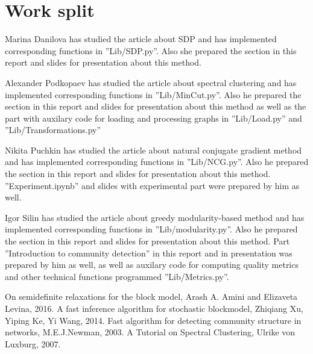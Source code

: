 \documentclass[11pt,a4paper]{extarticle}
\begin{document}
\section{Work split}

Marina Danilova has studied the article about SDP and has implemented corresponding functions in ''Lib/SDP.py''. 
Also she prepared the section in this report and slides for presentation about this method.

Alexander Podkopaev has studied the article about spectral clustering and has implemented corresponding functions in ''Lib/MinCut.py''.
Also he prepared the section in this report and slides for presentation about this method as well as the part with auxilary code for loading and processing graphs in ''Lib/Load.py'' and ''Lib/Transformations.py''

Nikita Puchkin has studied the article about natural conjugate gradient method and has implemented corresponding functions in ''Lib/NCG.py''.
Also he prepared the section in this report and slides for presentation about this method. ''Experiment.ipynb'' and slides with experimental part were prepared by him as well.

Igor Silin has studied the article about greedy modularity-based method and has implemented corresponding functions in ''Lib/modularity.py''.
Also he prepared the section in this report and slides for presentation about this method. Part ''Introduction to community detection'' in this report and in presentation  was prepared by him as well, as well as auxilary code for computing quality metrics and other technical functions programmed ''Lib/Metrics.py''.




\renewcommand{\refname}{References}
\begin{thebibliography}{9}
	On semidefinite relaxations for the block model, Arash A. Amini and Elizaveta Levina, 2016.
    A fast inference algorithm for stochastic blockmodel, Zhiqiang Xu, Yiping Ke, Yi Wang, 2014.
    Fast algorithm for detecting community structure in networks, M.E.J.Newman, 2003.
    A Tutorial on Spectral Clustering, Ulrike von Luxburg, 2007.
\end{thebibliography}
\end{document}
